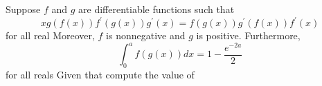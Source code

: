 Suppose $f$ and $g$ are differentiable functions such that \[xg(f(x))f^\prime(g(x))g^\prime(x)=f(g(x))g^\prime(f(x))f^\prime(x)\] for all real   Moreover, $f$ is nonnegative and $g$ is positive.  Furthermore, \[\int_0^a f(g(x))dx=1-\dfrac{e^{-2a}}{2}\] for all reals   Given that  compute the value of 